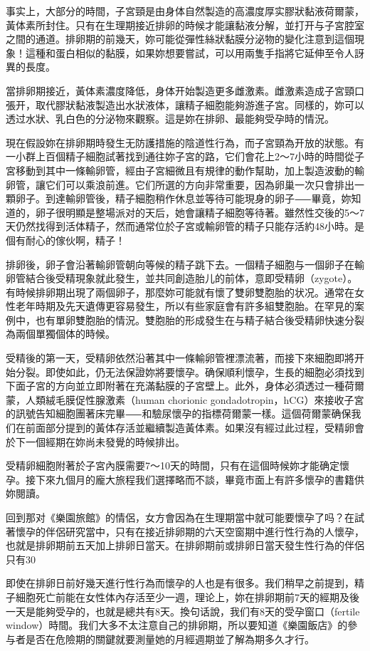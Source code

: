 \documentclass[12pt,UTF8]{ctexbook}
\begin{document}
事实上，大部分的時間，子宮頸是由身体自然製造的高濃度厚实膠狀黏液荷爾蒙，黃体素所封住。只有在生理期接近排卵的時候才能讓黏液分解，並打开与子宮腔室之間的通道。排卵期的前幾天，妳可能從彈性絲狀黏膜分泌物的變化注意到這個現象！這種和蛋白相似的黏膜，如果妳想要嘗試，可以用兩隻手指將它延伸至令人訝異的長度。

當排卵期接近，黃体素濃度降低，身体开始製造更多雌激素。雌激素造成子宮頸口張开，取代膠狀黏液製造出水狀液体，讓精子細胞能夠游進子宮。同樣的，妳可以透过水狀、乳白色的分泌物來觀察。這是妳在排卵、最能夠受孕時的情況。

現在假設妳在排卵期時發生无防護措施的陰道性行為，而子宮頸為开放的狀態。有一小群上百個精子細胞試著找到通往妳子宮的路，它们會花上2〜7小時的時間從子宮移動到其中一條輸卵管，經由子宮細微且有規律的動作幫助，加上製造波動的輸卵管，讓它们可以乘浪前進。它们所選的方向非常重要，因為卵巢一次只會排出一顆卵子。到達輸卵管後，精子細胞稍作休息並等待可能現身的卵子⸺畢竟，妳知道的，卵子很明顯是整場派对的天后，她會讓精子細胞等待著。雖然性交後的5〜7天仍然找得到活体精子，然而通常位於子宮或輸卵管的精子只能存活約48小時。是個有耐心的傢伙啊，精子！

排卵後，卵子會沿著輸卵管朝向等候的精子跳下去。一個精子細胞与一個卵子在輸卵管結合後受精現象就此發生，並共同創造胎儿的前体，意即受精卵（zygote）。有時候排卵期出現了兩個卵子，那麼妳可能就有懷了雙卵雙胞胎的状况。通常在女性老年時期及先天遺傳更容易發生，所以有些家庭會有許多組雙胞胎。在罕見的案例中，也有單卵雙胞胎的情況。雙胞胎的形成發生在与精子結合後受精卵快速分裂為兩個單獨個体的時候。

受精後的第一天，受精卵依然沿著其中一條輸卵管裡漂流著，而接下來細胞即將开始分裂。即使如此，仍无法保證妳將要懷孕。确保順利懷孕，生長的細胞必須找到下面子宮的方向並立即附著在充滿黏膜的子宮壁上。此外，身体必須透过一種荷爾蒙，人類絨毛膜促性腺激素（human chorionic gondadotropin，hCG）來接收子宮的訊號告知細胞團著床完畢⸺和驗尿懷孕的指標荷爾蒙一樣。這個荷爾蒙确保我们在前面部分提到的黃体存活並繼續製造黃体素。如果沒有經过此过程，受精卵會於下一個經期在妳尚未發覺的時候排出。

受精卵細胞附著於子宮內膜需要7〜10天的時間，只有在這個時候妳才能确定懷孕。接下來九個月的龐大旅程我们選擇略而不談，畢竟市面上有許多懷孕的書籍供妳閱讀。

回到那对《樂園旅館》的情侶，女方會因為在生理期當中就可能要懷孕了吗？在試著懷孕的伴侶研究當中，只有在接近排卵期的六天空窗期中進行性行為的人懷孕，也就是排卵期前五天加上排卵日當天。在排卵期前或排卵日當天發生性行為的伴侶只有30%

即使在排卵日前好幾天進行性行為而懷孕的人也是有很多。我们稍早之前提到，精子細胞死亡前能在女性体內存活至少一週，理论上，妳在排卵期前7天的經期及後一天是能夠受孕的，也就是總共有8天。換句话說，我们有8天的受孕窗口（fertile window）時間。我们大多不太注意自己的排卵期，所以要知道《樂園飯店》的參与者是否在危險期的關鍵就要測量她的月經週期並了解為期多久才行。
\end{document}

